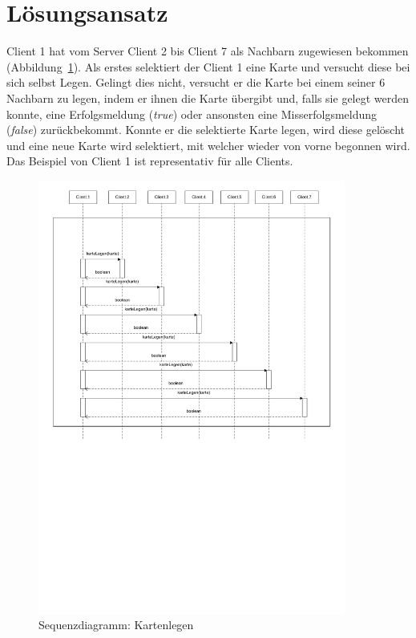 \section{Lösungsansatz} 

Client 1 hat vom Server Client 2 bis Client 7 als Nachbarn zugewiesen bekommen (Abbildung~\ref{clientkartelegenablauf}). Als erstes selektiert der Client 1 eine Karte und versucht diese bei sich selbst Legen. Gelingt dies nicht, versucht er die Karte bei einem seiner 6 Nachbarn zu legen, indem er ihnen die Karte übergibt und, falls sie gelegt werden konnte, eine Erfolgsmeldung (\textit{true}) oder ansonsten eine Misserfolgsmeldung (\textit{false}) zurückbekommt. Konnte er die selektierte Karte legen, wird diese gelöscht und eine neue Karte wird selektiert, mit welcher wieder von vorne begonnen wird. Das Beispiel von Client 1 ist representativ für alle Clients. 

\begin{figure}[hbt]
  \centering
  \includegraphics[width=0.90\textwidth,angle=0]{graphics/Kartenlegen_Sequenzdiagramm.pdf}
  \caption{Sequenzdiagramm: Kartenlegen}
  \label{clientkartelegenablauf}
\end{figure}

